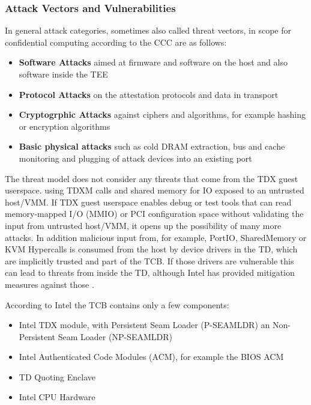 \subsubsection{Attack Vectors and Vulnerabilities}
In general attack categories, sometimes also called threat vectors, in scope for confidential computing according to the CCC are as follows:

\begin{itemize}
    \item \textbf{Software Attacks} aimed at firmware and software on the host and also software inside the \Gls{TEE}
    \item \textbf{Protocol Attacks} on the attestation protocols and data in transport
    \item \textbf{Cryptogrphic Attacks} against ciphers and algorithms, for example hashing or encryption algorithms
    \item \textbf{Basic physical attacks} such as \guillemotright cold DRAM extraction, bus and cache monitoring and plugging of attack devices into an existing port \guillemotleft \cite{confidential_computing_consortium_ccc--technical-analysis--confidential-computing-v13_unlockedpdf_2023}
\end{itemize}

The threat model does not consider any threats that come from the TDX guest userspace. using TDXM calls and shared memory for IO exposed to an untrusted host/VMM. If TDX guest userspace enables debug or test tools that can read memory-mapped I/O (MMIO) or PCI configuration space without validating the input from untrusted host/VMM, it opens up the possibility of many more attacks. In addition malicious input from, for example,  PortIO, SharedMemory or KVM Hypercalls is consumed from the host by device drivers in the TD, which are implicitly trusted and part of the TCB. If those drivers are vulnerable this can lead to threats from inside the TD, although Intel has provided mitigation measures against those \cite{elena_reshetova_intel_2023}.

According to Intel the TCB contains only a few components:

\begin{itemize}
    \item Intel TDX module, with Persistent Seam Loader (P-SEAMLDR) an Non-Persistent Seam Loader (NP-SEAMLDR)
    \item Intel Authenticated Code Modules (ACM), for example the BIOS ACM
    \item TD Quoting Enclave
    \item Intel CPU Hardware
\end{itemize}

